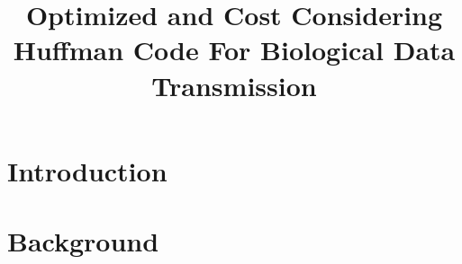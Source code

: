 \documentclass[preprint,12pt]{elsarticle}
\begin{document}
\begin{frontmatter}



\title{Optimized and Cost Considering Huffman Code For Biological Data Transmission}


\author{}

\address{}

\begin{abstract}

\end{abstract}

\begin{keyword}



\end{keyword}

\end{frontmatter}


\section{Introduction}
\label{sec1}

\section{Background}
\label{sec2}
\end{document}
